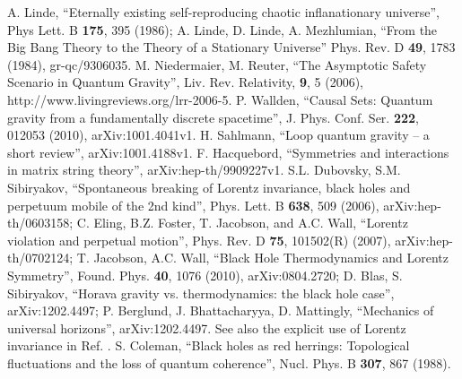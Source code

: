 \documentclass[12pt]{article}
\begin{document}
\begin{thebibliography}{99}
A. Linde, ``Eternally existing self-reproducing chaotic inflanationary universe'', Phys Lett. B \textbf{175}, 395 (1986);
A. Linde, D. Linde, A. Mezhlumian, ``From the Big Bang Theory to the Theory of a Stationary Universe'' Phys. Rev. D \textbf{49}, 1783 (1984), gr-qc/9306035.
M. Niedermaier, M. Reuter, ``The Asymptotic Safety Scenario in Quantum Gravity'', Liv. Rev. Relativity, \textbf{9}, 5 (2006), http://www.livingreviews.org/lrr-2006-5.
P. Wallden, ``Causal Sets: Quantum gravity from a fundamentally discrete spacetime'', J. Phys. Conf. Ser. \textbf{222}, 012053 (2010), 	arXiv:1001.4041v1.
H. Sahlmann, ``Loop quantum gravity -- a short review'', arXiv:1001.4188v1.
F. Hacquebord, ``Symmetries and interactions in matrix string theory'', arXiv:hep-th/9909227v1.
S.L. Dubovsky, S.M. Sibiryakov, ``Spontaneous breaking of Lorentz invariance, black holes and perpetuum mobile of the 2nd kind'', Phys. Lett. B \textbf{638}, 509 (2006), arXiv:hep-th/0603158; C. Eling, B.Z. Foster, T. Jacobson, and A.C. Wall, ``Lorentz violation and perpetual motion'', Phys. Rev. D \textbf{75}, 101502(R) (2007), arXiv:hep-th/0702124; T. Jacobson, A.C. Wall, ``Black Hole Thermodynamics and Lorentz Symmetry'', Found. Phys. \textbf{40}, 1076 (2010), arXiv:0804.2720; D. Blas, S. Sibiryakov, ``Horava gravity vs. thermodynamics: the black hole case'',  arXiv:1202.4497; P. Berglund, J. Bhattacharyya, D. Mattingly, ``Mechanics of universal horizons'', arXiv:1202.4497.  See also the explicit use of Lorentz invariance in Ref. \cite{myproofs}.
S. Coleman, ``Black holes as red herrings: Topological fluctuations and the loss of quantum coherence'', Nucl. Phys. B \textbf{307}, 867 (1988).
\end{thebibliography}
\end{document}
